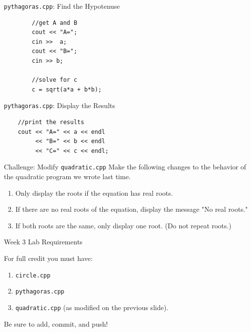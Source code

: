 \documentclass[]{beamer}
\begin{document}
\begin{frame}[fragile]{\texttt{pythagoras.cpp}: Find the Hypotenuse}
\begin{verbatim}
        //get A and B
        cout << "A=";
        cin >>  a;
        cout << "B=";
        cin >> b;

        //solve for c
        c = sqrt(a*a + b*b);
\end{verbatim}
\end{frame}


\begin{frame}[fragile]{\texttt{pythagoras.cpp}: Display the Results}
\begin{verbatim}
    //print the results
    cout << "A=" << a << endl
         << "B=" << b << endl
         << "C=" << c << endl;
\end{verbatim}
\end{frame}


\begin{frame}{Challenge: Modify \texttt{quadratic.cpp}}
    Make the following changes to the behavior of the quadratic
    program we wrote last time.
    \begin{enumerate}
        \item Only display the roots if the equation has real roots.
        \item If there are no real roots of the equation, display the
            message "No real roots."
        \item If both roots are the same, only display one root. (Do
            not repeat roots.)
    \end{enumerate}
\end{frame}

\begin{frame}{Week 3 Lab Requirements}

    For full credit you must have:
    \begin{enumerate}
        \item \texttt{circle.cpp}
        \item \texttt{pythagoras.cpp}
        \item \texttt{quadratic.cpp} (as modified on the previous
        slide).
    \end{enumerate}

    Be sure to add, commit, and push!
\end{frame}
\end{document}
